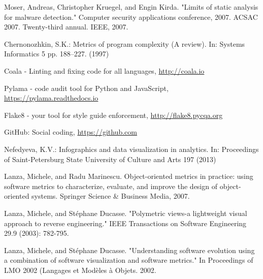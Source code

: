 \documentclass[runningheads,a4paper]{llncs}
\begin{document}
\begin{thebibliography}{4}
 Moser, Andreas, Christopher Kruegel, and Engin Kirda. "Limits of static analysis for malware detection." Computer security applications conference, 2007. ACSAC 2007. Twenty-third annual. IEEE, 2007.

 Chernonozhkin, S.K.: Metrics of program complexity (A review).
  In: Systems Informatics 5 pp. 188--227. (1997)
  
 Coala - Linting and fixing code for all languages, \url{http://coala.io}

 Pylama - code audit tool for Python and JavaScript, \url{https://pylama.readthedocs.io}

 Flake8 - your tool for style guide enforcement, \url{http://flake8.pycqa.org}

 GitHub: Social coding, \url{https://github.com}

 Nefedyeva, K.V.: Infographics and data visualization in
  analytics. In: Proceedings of Saint-Petersburg State University of Culture and
  Arts 197 (2013)

 Lanza, Michele, and Radu Marinescu. Object-oriented metrics in practice: using software metrics to characterize, evaluate, and improve the design of object-oriented systems. Springer Science \& Business Media, 2007.

 Lanza, Michele, and Stéphane Ducasse. "Polymetric views-a lightweight visual approach to reverse engineering." IEEE Transactions on Software Engineering 29.9 (2003): 782-795.

 Lanza, Michele, and Stéphane Ducasse. "Understanding software evolution using a combination of software visualization and software metrics." In Proceedings of LMO 2002 (Langages et Modèles à Objets. 2002.

\end{thebibliography}
\end{document}
